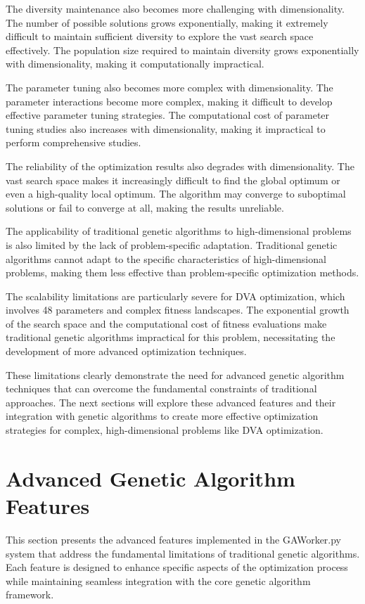 \documentclass[12pt,a4paper]{article}
\begin{document}
The diversity maintenance also becomes more challenging with dimensionality. The number of possible solutions grows exponentially, making it extremely difficult to maintain sufficient diversity to explore the vast search space effectively. The population size required to maintain diversity grows exponentially with dimensionality, making it computationally impractical.

The parameter tuning also becomes more complex with dimensionality. The parameter interactions become more complex, making it difficult to develop effective parameter tuning strategies. The computational cost of parameter tuning studies also increases with dimensionality, making it impractical to perform comprehensive studies.

The reliability of the optimization results also degrades with dimensionality. The vast search space makes it increasingly difficult to find the global optimum or even a high-quality local optimum. The algorithm may converge to suboptimal solutions or fail to converge at all, making the results unreliable.

The applicability of traditional genetic algorithms to high-dimensional problems is also limited by the lack of problem-specific adaptation. Traditional genetic algorithms cannot adapt to the specific characteristics of high-dimensional problems, making them less effective than problem-specific optimization methods.

The scalability limitations are particularly severe for DVA optimization, which involves 48 parameters and complex fitness landscapes. The exponential growth of the search space and the computational cost of fitness evaluations make traditional genetic algorithms impractical for this problem, necessitating the development of more advanced optimization techniques.

These limitations clearly demonstrate the need for advanced genetic algorithm techniques that can overcome the fundamental constraints of traditional approaches. The next sections will explore these advanced features and their integration with genetic algorithms to create more effective optimization strategies for complex, high-dimensional problems like DVA optimization.

\section{Advanced Genetic Algorithm Features}

This section presents the advanced features implemented in the GAWorker.py system that address the fundamental limitations of traditional genetic algorithms. Each feature is designed to enhance specific aspects of the optimization process while maintaining seamless integration with the core genetic algorithm framework.
\end{document}
